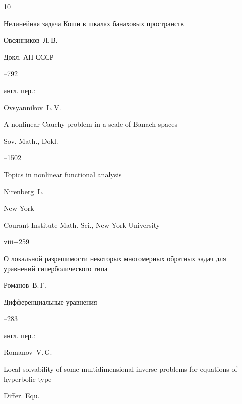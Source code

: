 \begin{thebibliography}{10}




\paper Нелинейная задача Коши в шкалах банаховых пространств

\by Овсянников~Л.\,В.

\jour Докл. АН  СССР




--792

\transl англ. пер.:~

\by Ovsyannikov~L.\,V.

\paper A nonlinear Cauchy problem in a scale of Banach spaces

\jour Sov. Math., Dokl. 


--1502 







\book Topics in nonlinear functional analysis

\by Nirenberg~L.

\publaddr New York

\publ Courant Institute Math. Sci., New York University


\totalpages viii+259






\paper О локальной разрешимости некоторых многомерных обратных задач  для уравнений гиперболического типа

\by Романов~В.\,Г.

\jour Дифференциальные уравнения




--283

\transl англ. пер.:~

\by Romanov~V.\,G. 

\paper Local solvability of some multidimensional inverse problems for equations of hyperbolic type

\jour Differ. Equ.


\end{thebibliography}
